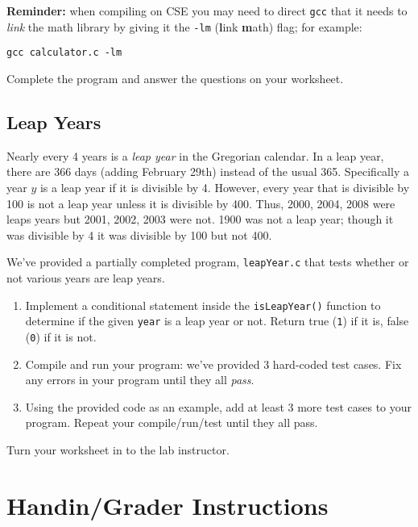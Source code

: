 \documentclass[12pt]{scrartcl}
\begin{document}
\textbf{Reminder:} when compiling on CSE you may need to direct \texttt{gcc}
that it needs to \emph{link} the math library by giving it the \texttt{-lm} 
(\textbf{l}ink \textbf{m}ath) flag; for example:

\texttt{gcc calculator.c -lm}

Complete the program and answer the questions on your worksheet.

\subsection{Leap Years}

Nearly every 4 years is a \emph{leap year} in the Gregorian calendar.
In a leap year, there are 366 days (adding February 29th) instead of the
usual 365.  Specifically a year $y$ is a leap year if it is divisible
by 4.  However, every year that is divisible by 100 is not a leap year 
unless it is divisible by 400.  Thus, 2000, 2004, 2008 were leaps years
but 2001, 2002, 2003 were not.  1900 was not a leap year; though it was
divisible by 4 it was divisible by 100 but not 400.

We've provided a partially completed program, \texttt{leapYear.c}
that tests whether or not various years are leap years.  

\begin{enumerate}
  \item Implement a conditional statement inside the 
  \texttt{isLeapYear()} function to determine if the given
  \texttt{year} is a leap year or not.  Return true (\texttt{1})
  if it is, false (\texttt{0}) if it is not.
  \item Compile and run your program: we've provided 3 
  hard-coded test cases.  Fix any errors in your program until they all 
  \emph{pass}.  
  \item Using the provided code as an example, add at least 3 more
  test cases to your program.  Repeat your compile/run/test until they
  all pass.
\end{enumerate}

Turn your worksheet in to the lab instructor.

\section{Handin/Grader Instructions}
\end{document}
